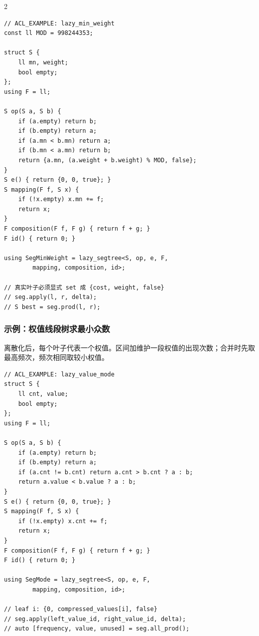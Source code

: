 \begin{multicols*}{2}
			\begin{verbatim}
// ACL_EXAMPLE: lazy_min_weight
const ll MOD = 998244353;

struct S {
    ll mn, weight;
    bool empty;
};
using F = ll;

S op(S a, S b) {
    if (a.empty) return b;
    if (b.empty) return a;
    if (a.mn < b.mn) return a;
    if (b.mn < a.mn) return b;
    return {a.mn, (a.weight + b.weight) % MOD, false};
}
S e() { return {0, 0, true}; }
S mapping(F f, S x) {
    if (!x.empty) x.mn += f;
    return x;
}
F composition(F f, F g) { return f + g; }
F id() { return 0; }

using SegMinWeight = lazy_segtree<S, op, e, F,
        mapping, composition, id>;

// 真实叶子必须显式 set 成 {cost, weight, false}
// seg.apply(l, r, delta);
// S best = seg.prod(l, r);
			\end{verbatim}

			\subsubsection{示例：权值线段树求最小众数}

			离散化后，每个叶子代表一个权值。区间加维护一段权值的出现次数；合并时先取最高频次，频次相同取较小权值。

			\begin{verbatim}
// ACL_EXAMPLE: lazy_value_mode
struct S {
    ll cnt, value;
    bool empty;
};
using F = ll;

S op(S a, S b) {
    if (a.empty) return b;
    if (b.empty) return a;
    if (a.cnt != b.cnt) return a.cnt > b.cnt ? a : b;
    return a.value < b.value ? a : b;
}
S e() { return {0, 0, true}; }
S mapping(F f, S x) {
    if (!x.empty) x.cnt += f;
    return x;
}
F composition(F f, F g) { return f + g; }
F id() { return 0; }

using SegMode = lazy_segtree<S, op, e, F,
        mapping, composition, id>;

// leaf i: {0, compressed_values[i], false}
// seg.apply(left_value_id, right_value_id, delta);
// auto [frequency, value, unused] = seg.all_prod();
			\end{verbatim}

		\end{multicols*}
